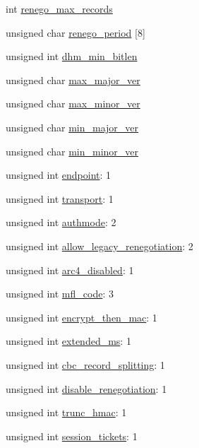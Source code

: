 \begin{DoxyCompactItemize}
$$int \hyperlink{structmbedtls__ssl__config_a0f2ff6d7f481f9ffaf40025289011a2d}{renego\+\_\+max\+\_\+records}
\item 
unsigned char \hyperlink{structmbedtls__ssl__config_ab1e7273cb7a477f5cb303134055555b0}{renego\+\_\+period} \mbox{[}8\mbox{]}
\item 
unsigned int \hyperlink{structmbedtls__ssl__config_abba2011a713a2afab2cf724c21f11efb}{dhm\+\_\+min\+\_\+bitlen}
\item 
unsigned char \hyperlink{structmbedtls__ssl__config_a10a7ca31f5096d71fc9effbe004d3fd8}{max\+\_\+major\+\_\+ver}
\item 
unsigned char \hyperlink{structmbedtls__ssl__config_a5cd10b5cbe18392c64fa6831cb222243}{max\+\_\+minor\+\_\+ver}
\item 
unsigned char \hyperlink{structmbedtls__ssl__config_ae349313f286e0e79d21d18fe40fba06f}{min\+\_\+major\+\_\+ver}
\item 
unsigned char \hyperlink{structmbedtls__ssl__config_a61579a80f1aa272cc8d9f7c2786b7b30}{min\+\_\+minor\+\_\+ver}
\item 
unsigned int \hyperlink{structmbedtls__ssl__config_a7ee72d610d141b932141bf8afb3aec2a}{endpoint}\+: 1
\item 
unsigned int \hyperlink{structmbedtls__ssl__config_a63cafd8d131ac7d162406b47bc6565d0}{transport}\+: 1
\item 
unsigned int \hyperlink{structmbedtls__ssl__config_a0d3c2ea8eaf59a5acfcdb6b123148c1f}{authmode}\+: 2
\item 
unsigned int \hyperlink{structmbedtls__ssl__config_afcd4e0685b3fca3c49043bdd6a84490f}{allow\+\_\+legacy\+\_\+renegotiation}\+: 2
\item 
unsigned int \hyperlink{structmbedtls__ssl__config_a7155fd95a3206146ef1374341d008e92}{arc4\+\_\+disabled}\+: 1
\item 
unsigned int \hyperlink{structmbedtls__ssl__config_a67e52d2668c7f4bc4f6a872c35a679ab}{mfl\+\_\+code}\+: 3
\item 
unsigned int \hyperlink{structmbedtls__ssl__config_a8f9e666cb46e055bed2b799a94a85e3e}{encrypt\+\_\+then\+\_\+mac}\+: 1
\item 
unsigned int \hyperlink{structmbedtls__ssl__config_ac6ac2c30ac20fc9033913e0de6ffbe93}{extended\+\_\+ms}\+: 1
\item 
unsigned int \hyperlink{structmbedtls__ssl__config_a053c327dda99451c6e82cda73e27d322}{cbc\+\_\+record\+\_\+splitting}\+: 1
\item 
unsigned int \hyperlink{structmbedtls__ssl__config_a953d3f0bbb40ed6f4020dc3e1a196dfb}{disable\+\_\+renegotiation}\+: 1
\item 
unsigned int \hyperlink{structmbedtls__ssl__config_a24bf9d624a2e2432518e9da8ae908db4}{trunc\+\_\+hmac}\+: 1
\item 
unsigned int \hyperlink{structmbedtls__ssl__config_a1b988bcd1b38c51cb802bf8af5d05c7b}{session\+\_\+tickets}\+: 1
\end{DoxyCompactItemize}


